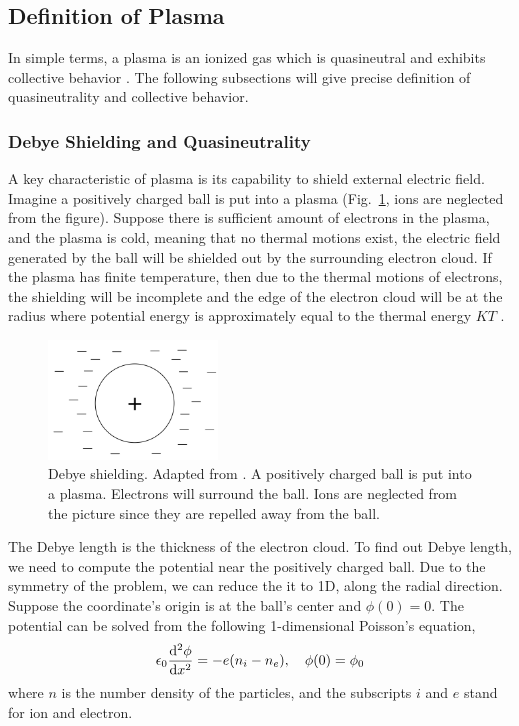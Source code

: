 \subsection{Definition of Plasma}
In simple terms, a plasma is an ionized gas which is quasineutral and exhibits collective behavior \cite{chen_introduction_2016}. The following subsections will give precise definition of quasineutrality and collective behavior.

\subsubsection*{Debye Shielding and Quasineutrality}
A key characteristic of plasma is its capability to shield external electric field. Imagine a positively charged ball is put into a plasma (Fig.~\ref{fig:debye-shielding}, ions are neglected from the figure). Suppose there is sufficient amount of electrons in the plasma, and the plasma is cold, meaning that no thermal motions exist, the electric field generated by the ball will be shielded out by the surrounding electron cloud. If the plasma has finite temperature, then due to the thermal motions of electrons, the shielding will be incomplete and the edge of the electron cloud will be at the radius where potential energy is approximately equal to the thermal energy $KT$ \cite{chen_introduction_2016}.

\begin{figure}[htbp]
	\centering
	\includegraphics[width=0.4\textwidth]{figures/debye-shielding.png}
	\caption{Debye shielding. Adapted from \cite{chen_introduction_2016}. A positively charged ball is put into a plasma. Electrons will surround the ball. Ions are neglected from the picture since they are repelled away from the ball.}
	\label{fig:debye-shielding}
\end{figure}

The Debye length is the thickness of the electron cloud. To find out Debye length, we need to compute the potential near the positively charged ball. Due to the symmetry of the problem, we can reduce the it to 1D, along the radial direction. Suppose the coordinate's origin is at the ball's center and $\phi(0)=0$. The potential can be solved from the following 1-dimensional Poisson's equation,
\begin{equation}
	\epsilon_0\dv[2]{\phi}{x} = -e(n_i - n_e), \quad \phi(0) = \phi_0
	\label{eq:poisson-equation-1d}
\end{equation}
where $n$ is the number density of the particles, and the subscripts $i$ and $e$ stand for ion and electron.

